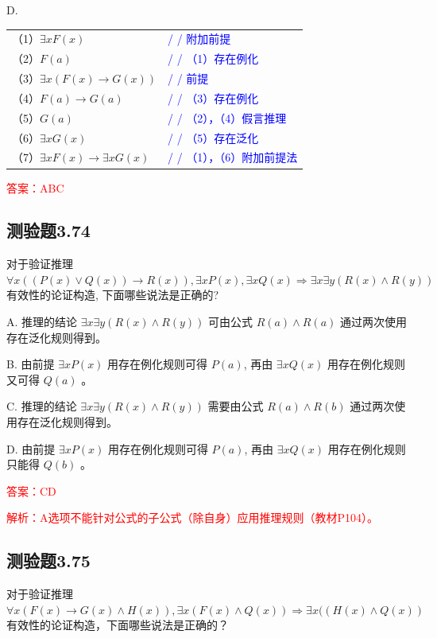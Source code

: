 \documentclass[UTF8, heading=true]{ctexart}
\begin{document}
D. 

\begin{tabular}{ll}
  （1）$\exists x F(x)$ & \textcolor{blue}{/ / 附加前提} \\
  （2）$F(a)$ & \textcolor{blue}{/ / （1）存在例化} \\
  （3）$\exists x(F(x) \rightarrow G(x))$ & \textcolor{blue}{/ / 前提} \\
  （4）$F(a) \rightarrow G(a)$ & \textcolor{blue}{/ / （3）存在例化} \\
  （5）$G(a)$ & \textcolor{blue}{/ / （2），（4）假言推理} \\
  （6）$\exists x G(x)$ & \textcolor{blue}{/ / （5）存在泛化} \\
  （7）$\exists x F(x) \rightarrow \exists x G(x)$ & \textcolor{blue}{/ / （1），（6）附加前提法}
\end{tabular}

\textcolor{red}{答案：ABC}



\subsection{测验题3.74}

对于验证推理 $\forall x((P(x) \vee Q(x)) \rightarrow R(x)), \exists x P(x), \exists x Q(x) \Longrightarrow \exists x \exists y(R(x) \wedge R(y))$ 有效性的论证构造, 下面哪些说法是正确的?

A. 推理的结论 $\exists x \exists y(R(x) \wedge R(y))$ 可由公式 $R(a) \wedge R(a)$ 通过两次使用存在泛化规则得到。

B. 由前提 $\exists x P(x)$ 用存在例化规则可得 $P(a)$, 再由 $\exists x Q(x)$ 用存在例化规则又可得 $Q(a)$ 。

C. 推理的结论 $\exists x \exists y(R(x) \wedge R(y))$ 需要由公式 $R(a) \wedge R(b)$ 通过两次使用存在泛化规则得到。

D. 由前提 $\exists x P(x)$ 用存在例化规则可得 $P(a)$, 再由 $\exists x Q(x)$ 用存在例化规则只能得 $Q(b)$ 。

\textcolor{red}{答案：CD}

\textcolor{red}{解析：A选项不能针对公式的子公式（除自身）应用推理规则（教材P104）。}

\subsection{测验题3.75}

对于验证推理 $\forall x(F(x) \rightarrow G(x) \wedge H(x)), \exists x(F(x) \wedge Q(x)) \Longrightarrow \exists x((H(x) \wedge Q(x))$ 有效性的论证构造，下面哪些说法是正确的？
\end{document}
